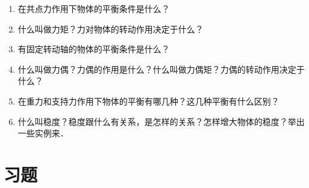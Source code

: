\begin{enumerate}
    \item 在共点力作用下物体的平衡条件是什么？
    \item 什么叫做力矩？力对物体的转动作用决定于什么？
    \item 有固定转动轴的物体的平衡条件是什么？
    \item 什么叫做力偶？力偶的作用是什么？什么叫做力偶矩？力偶的转动作用决定于什么？
    \item 在重力和支持力作用下物体的平衡有哪几种？这几种平衡有什么区别？
    \item 什么叫稳度？稳度跟什么有关系，是怎样的关系？怎样增大物体的稳度？举出一些实例来．
\end{enumerate}

\section*{习题}
